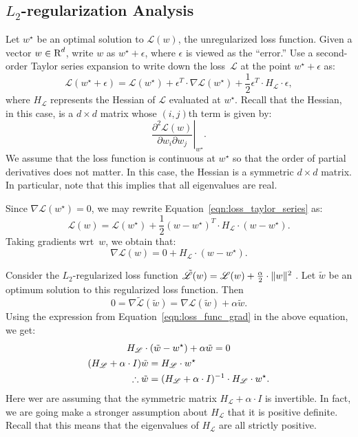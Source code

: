 \subsection{$L_2$-regularization Analysis}
Let $w^{\star}$ be an optimal solution to $\mathscr{L}(w)$, the unregularized 
loss function. Given a vector $w \in \text{R}^{d}$, write $w$ as $w^{\star} + \epsilon$, 
where $\epsilon$ is viewed as the ``error.'' Use a second-order Taylor series  
expansion to write down the loss~$\mathscr{L}$ at the point $w^{\star} + \epsilon$ 
as:
\begin{equation}
\label{eqn:loss_taylor_series}
\mathscr{L}(w^{\star} + \epsilon) = 
    \mathscr{L}(w^{\star}) + 
    \epsilon^{T} \cdot \nabla \mathscr{L}(w^{\star}) +
    \frac{1}{2} \epsilon^{T} \cdot H_{\mathscr{L}} \cdot \epsilon,
\end{equation}
where $H_{\mathscr{L}}$ represents the Hessian of $\mathscr{L}$ evaluated at 
$w^{\star}$. Recall that the Hessian, in this case, is a $d \times d$ matrix 
whose $(i, j)$th term is given by:
\[
    \left . \frac{\partial^2 \mathscr{L}(w)}{\partial w_i \partial w_j} \right |_{w^{\star}}.
\]
We assume that the loss function is continuous at $w^{\star}$ so that the order 
of partial derivatives does not matter. In this case, the Hessian is a symmetric 
$d \times d$ matrix. In particular, note that this implies that all eigenvalues 
are real. 

Since $\nabla \mathscr{L}(w^{\star}) = 0$, we may rewrite 
Equation~\ref{eqn:loss_taylor_series} as:
\[
    \mathscr{L}(w) = \mathscr{L}(w^{\star}) + 
    \frac{1}{2} (w - w^{\star})^{T} \cdot H_{\mathscr{L}} \cdot (w - w^{\star}).
\]
Taking gradients wrt~$w$, we obtain that:
\begin{equation}
\label{eqn:loss_func_grad}
    \nabla \mathscr{L}(w) = 0 + H_{\mathscr{L}} \cdot (w - w^{\star}).
\end{equation}

Consider the $L_2$-regularized loss function 
$\tilde{\mathscr{L}}(w) = \mathscr{L}(w) + \frac{\alpha}{2} \cdot \lVert w\rVert^2$ .
Let $\tilde{w}$ be an optimum solution to this regularized loss function. Then 
\begin{equation}
\label{eqn:reg_loss_func_grad}
    0 = \nabla \tilde{\mathscr{L}}(\tilde{w}) = 
        \nabla \mathscr{L}(\tilde{w}) 
        + \alpha \tilde{w}.
\end{equation}
Using the expression from Equation~\ref{eqn:loss_func_grad} in the above equation, 
we get:
\begin{gather}
H_{\mathscr{L}} \cdot (\tilde{w} - w^{\star}) + \alpha \tilde{w} = 0 \notag \\
\begin{split}
(H_{\mathscr{L}} + \alpha \cdot I) \tilde{w} & = H_{\mathscr{L}} \cdot w^{\star} \\
\therefore \tilde{w} & = (H_{\mathscr{L}} + \alpha \cdot I)^{-1} \cdot H_{\mathscr{L}} \cdot w^{\star}.
\end{split}
\end{gather}
Here wer are assuming that the symmetric matrix $H_{\mathscr{L}} + \alpha \cdot I$
is invertible. In fact, we are going make a stronger assumption about $H_{\mathscr{L}}$
that it is positive definite. Recall that this means that the eigenvalues of 
$H_{\mathscr{L}}$ are all strictly positive. 
